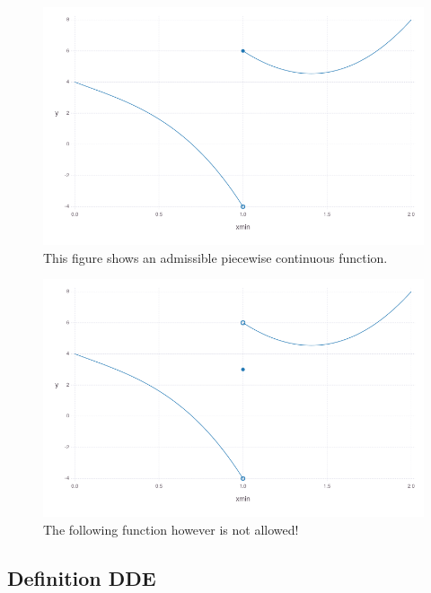 \documentclass[10pt]{article}
\begin{document}

\begin{figure}[h]\centering
	\includegraphics[width=\textwidth]{allowed.png}
	\caption{This figure shows an admissible piecewise continuous function.}
	\label{fig:allowed}
\end{figure}

\begin{figure}[h]\centering
    \includegraphics[width=\textwidth]{not-allowed.png}
	\caption{The following function however is not allowed!}
	\label{fig:not-allowed}
\end{figure}


\subsection{Definition DDE} \label{sec:definition-dde}
\end{document}

